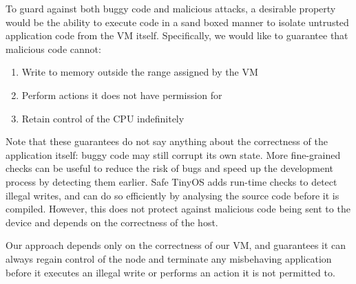 To guard against both buggy code and malicious attacks, a desirable property would be the ability to execute code in a sand boxed manner to isolate untrusted application code from the VM itself. Specifically, we would like to guarantee that malicious code cannot:
\begin{enumerate}
    \item Write to memory outside the range assigned by the VM
    \item Perform actions it does not have permission for
    \item Retain control of the CPU indefinitely
\end{enumerate}

Note that these guarantees do not say anything about the correctness of the application itself: buggy code may still corrupt its own state. More fine-grained checks can be useful to reduce the risk of bugs and speed up the development process by detecting them earlier. Safe TinyOS \cite{Cooprider:2007ub} adds run-time checks to detect illegal writes, and can do so efficiently by analysing the source code before it is compiled. However, this does not protect against malicious code being sent to the device and depends on the correctness of the host.

Our approach depends only on the correctness of our VM, and guarantees it can always regain control of the node and terminate any misbehaving application before it executes an illegal write or performs an action it is not permitted to.


